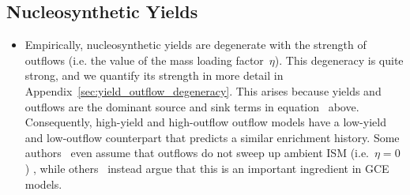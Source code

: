 \documentclass[ms.tex]{subfiles}
\begin{document}
\subsection{Nucleosynthetic Yields}
\label{sec:onezone:yields}

\begin{itemize}

	\item Empirically, nucleosynthetic yields are degenerate with the strength
	of outflows (i.e. the value of the mass loading factor~$\eta$).
	This degeneracy is quite strong, and we quantify its strength in more
	detail in Appendix~\ref{sec:yield_outflow_degeneracy}.
	This arises because yields and outflows are the dominant source and sink
	terms in equation~ above.
	Consequently, high-yield and high-outflow outflow models have a low-yield
	and low-outflow counterpart that predicts a similar enrichment history.
	Some authors~\citep[e.g.][]{Minchev2013, Minchev2014, Minchev2017,
	Spitoni2020, Spitoni2021} even assume that outflows do not sweep up ambient
	ISM (i.e.~$\eta = 0$) , while others~\citep[e.g.][]{Andrews2017,
	Weinberg2017, Cote2017, Trueman2022} instead argue that this is an
	important ingredient in GCE models.


\end{itemize}
\end{document}
